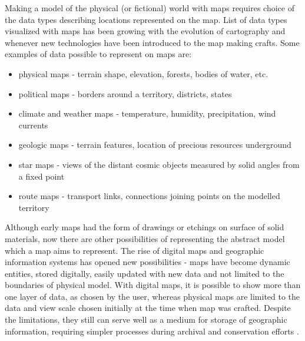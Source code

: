 \documentclass[12pt]{report}
\begin{document}
Making a model of the physical (or fictional) world with maps requires choice of the data types describing locations represented on the map. List of data types visualized with maps has been growing with the evolution of cartography and whenever new technologies have been introduced to the map making crafts. Some examples of data possible to represent on maps are:
 
\begin{itemize}
	\item physical maps - terrain shape, elevation, forests, bodies of water, etc.
	\item political maps - borders around a territory, districts, states
	\item climate and weather maps - temperature, humidity, precipitation, wind currents
	\item geologic maps - terrain features, location of precious resources underground
	\item star maps - views of the distant cosmic objects measured by solid angles from a fixed point
	\item route maps - transport links, connections joining points on the modelled territory
\end{itemize}

Although early maps had the form of drawings or etchings on surface of solid materials, now there are other possibilities of representing the abstract model which a map aims to represent. The rise of digital maps and geographic information systems has opened new possibilities - maps have become dynamic entities, stored digitally, easily updated with new data and not limited to the boundaries of physical model. With digital maps, it is possible to show more than one layer of data, as chosen by the user, whereas physical maps are limited to the data and view scale chosen initially at the time when map was crafted. Despite the limitations, they still can serve well as a medium for storage of geographic information, requiring simpler processes during archival and conservation efforts \autocite{bagrow2017history}.
\end{document}
